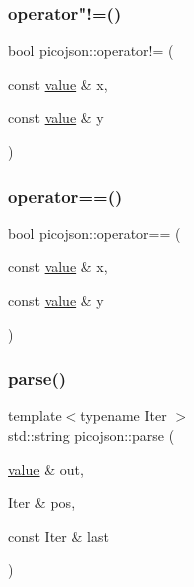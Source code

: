 \hypertarget{namespacepicojson_ae46de1e9659b427ea359e7fc00dd3ff1}{}\label{namespacepicojson_ae46de1e9659b427ea359e7fc00dd3ff1} 
\subsubsection{\texorpdfstring{operator"!=()}{operator!=()}}
{\footnotesize\ttfamily bool picojson\+::operator!= (\begin{DoxyParamCaption}\item[{const \hyperlink{classpicojson_1_1value}{value} \&}]{x,  }\item[{const \hyperlink{classpicojson_1_1value}{value} \&}]{y }\end{DoxyParamCaption})\hspace{0.3cm}{\ttfamily [inline]}}

\hypertarget{namespacepicojson_a498fde71ce35268547d93068d9a756be}{}\label{namespacepicojson_a498fde71ce35268547d93068d9a756be} 
\subsubsection{\texorpdfstring{operator==()}{operator==()}}
{\footnotesize\ttfamily bool picojson\+::operator== (\begin{DoxyParamCaption}\item[{const \hyperlink{classpicojson_1_1value}{value} \&}]{x,  }\item[{const \hyperlink{classpicojson_1_1value}{value} \&}]{y }\end{DoxyParamCaption})\hspace{0.3cm}{\ttfamily [inline]}}

\hypertarget{namespacepicojson_a3aca598f5855bc130a92a3e08a0c6ebf}{}\label{namespacepicojson_a3aca598f5855bc130a92a3e08a0c6ebf} 
\subsubsection{\texorpdfstring{parse()}{parse()}\hspace{0.1cm}{\footnotesize\ttfamily [1/4]}}
{\footnotesize\ttfamily template$<$typename Iter $>$ \\
std\+::string picojson\+::parse (\begin{DoxyParamCaption}\item[{\hyperlink{classpicojson_1_1value}{value} \&}]{out,  }\item[{Iter \&}]{pos,  }\item[{const Iter \&}]{last }\end{DoxyParamCaption})\hspace{0.3cm}{\ttfamily [inline]}}


